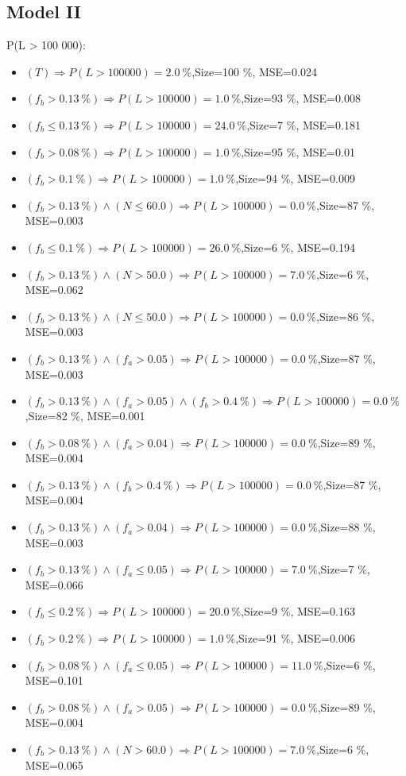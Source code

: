\documentclass[numbered]{CSL}
\begin{document}
\subsection{Model II}
P(L > 100 000):
\begin{itemize}
\item $(T) \Rightarrow P(L > 100 000) = 2.0~\%$,\hfill Size=100 \%, MSE=0.024
\item $(f_b > 0.13~\%) \Rightarrow P(L > 100 000) = 1.0~\%$,\hfill Size=93 \%, MSE=0.008
\item $(f_b \leq 0.13~\%) \Rightarrow P(L > 100 000) = 24.0~\%$,\hfill Size=7 \%, MSE=0.181
\item $(f_b > 0.08~\%) \Rightarrow P(L > 100 000) = 1.0~\%$,\hfill Size=95 \%, MSE=0.01
\item $(f_b > 0.1~\%) \Rightarrow P(L > 100 000) = 1.0~\%$,\hfill Size=94 \%, MSE=0.009
\item $(f_b > 0.13~\%) \land (N \leq 60.0) \Rightarrow P(L > 100 000) = 0.0~\%$,\hfill Size=87 \%, MSE=0.003
\item $(f_b \leq 0.1~\%) \Rightarrow P(L > 100 000) = 26.0~\%$,\hfill Size=6 \%, MSE=0.194
\item $(f_b > 0.13~\%) \land (N > 50.0) \Rightarrow P(L > 100 000) = 7.0~\%$,\hfill Size=6 \%, MSE=0.062
\item $(f_b > 0.13~\%) \land (N \leq 50.0) \Rightarrow P(L > 100 000) = 0.0~\%$,\hfill Size=86 \%, MSE=0.003
\item $(f_b > 0.13~\%) \land (f_a > 0.05) \Rightarrow P(L > 100 000) = 0.0~\%$,\hfill Size=87 \%, MSE=0.003
\item $(f_b > 0.13~\%) \land (f_a > 0.05) \land (f_b > 0.4~\%) \Rightarrow P(L > 100 000) = 0.0~\%$,\hfill Size=82 \%, MSE=0.001
\item $(f_b > 0.08~\%) \land (f_a > 0.04) \Rightarrow P(L > 100 000) = 0.0~\%$,\hfill Size=89 \%, MSE=0.004
\item $(f_b > 0.13~\%) \land (f_b > 0.4~\%) \Rightarrow P(L > 100 000) = 0.0~\%$,\hfill Size=87 \%, MSE=0.004
\item $(f_b > 0.13~\%) \land (f_a > 0.04) \Rightarrow P(L > 100 000) = 0.0~\%$,\hfill Size=88 \%, MSE=0.003
\item $(f_b > 0.13~\%) \land (f_a \leq 0.05) \Rightarrow P(L > 100 000) = 7.0~\%$,\hfill Size=7 \%, MSE=0.066
\item $(f_b \leq 0.2~\%) \Rightarrow P(L > 100 000) = 20.0~\%$,\hfill Size=9 \%, MSE=0.163
\item $(f_b > 0.2~\%) \Rightarrow P(L > 100 000) = 1.0~\%$,\hfill Size=91 \%, MSE=0.006
\item $(f_b > 0.08~\%) \land (f_a \leq 0.05) \Rightarrow P(L > 100 000) = 11.0~\%$,\hfill Size=6 \%, MSE=0.101
\item $(f_b > 0.08~\%) \land (f_a > 0.05) \Rightarrow P(L > 100 000) = 0.0~\%$,\hfill Size=89 \%, MSE=0.004
\item $(f_b > 0.13~\%) \land (N > 60.0) \Rightarrow P(L > 100 000) = 7.0~\%$,\hfill Size=6 \%, MSE=0.065
\end{itemize}
\end{document}
